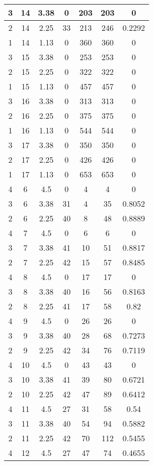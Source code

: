 \documentclass[letterpaper, 12pt]{article}
\begin{document}
\begin{longtable}{|c|c|c|c|c|c|c|}
\hline
3 & 14 & 3.38 & 0 & 203 & 203 & 0 \\
\hline
2 & 14 & 2.25 & 33 & 213 & 246 & 0.2292 \\
\hline
1 & 14 & 1.13 & 0 & 360 & 360 & 0 \\
\hline
3 & 15 & 3.38 & 0 & 253 & 253 & 0 \\
\hline
2 & 15 & 2.25 & 0 & 322 & 322 & 0 \\
\hline
1 & 15 & 1.13 & 0 & 457 & 457 & 0 \\
\hline
3 & 16 & 3.38 & 0 & 313 & 313 & 0 \\
\hline
2 & 16 & 2.25 & 0 & 375 & 375 & 0 \\
\hline
1 & 16 & 1.13 & 0 & 544 & 544 & 0 \\
\hline
3 & 17 & 3.38 & 0 & 350 & 350 & 0 \\
\hline
2 & 17 & 2.25 & 0 & 426 & 426 & 0 \\
\hline
1 & 17 & 1.13 & 0 & 653 & 653 & 0 \\
\hline
4 & 6 & 4.5 & 0 & 4 & 4 & 0 \\
\hline
3 & 6 & 3.38 & 31 & 4 & 35 & 0.8052 \\
\hline
2 & 6 & 2.25 & 40 & 8 & 48 & 0.8889 \\
\hline
4 & 7 & 4.5 & 0 & 6 & 6 & 0 \\
\hline
3 & 7 & 3.38 & 41 & 10 & 51 & 0.8817 \\
\hline
2 & 7 & 2.25 & 42 & 15 & 57 & 0.8485 \\
\hline
4 & 8 & 4.5 & 0 & 17 & 17 & 0 \\
\hline
3 & 8 & 3.38 & 40 & 16 & 56 & 0.8163 \\
\hline
2 & 8 & 2.25 & 41 & 17 & 58 & 0.82 \\
\hline
4 & 9 & 4.5 & 0 & 26 & 26 & 0 \\
\hline
3 & 9 & 3.38 & 40 & 28 & 68 & 0.7273 \\
\hline
2 & 9 & 2.25 & 42 & 34 & 76 & 0.7119 \\
\hline
4 & 10 & 4.5 & 0 & 43 & 43 & 0 \\
\hline
3 & 10 & 3.38 & 41 & 39 & 80 & 0.6721 \\
\hline
2 & 10 & 2.25 & 42 & 47 & 89 & 0.6412 \\
\hline
4 & 11 & 4.5 & 27 & 31 & 58 & 0.54 \\
\hline
3 & 11 & 3.38 & 40 & 54 & 94 & 0.5882 \\
\hline
2 & 11 & 2.25 & 42 & 70 & 112 & 0.5455 \\
\hline
4 & 12 & 4.5 & 27 & 47 & 74 & 0.4655 \\

\end{longtable}
\end{document}
